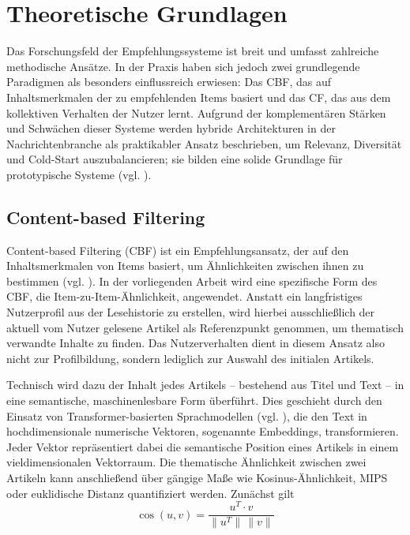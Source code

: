 

\section{Theoretische Grundlagen}
Das Forschungsfeld der Empfehlungssysteme ist breit und umfasst zahlreiche methodische
Ansätze. In der Praxis haben sich jedoch zwei grundlegende Paradigmen als besonders einflussreich erwiesen:
Das \ac{CBF}, das auf Inhaltsmerkmalen der zu empfehlenden Items basiert und das \ac{CF}, das aus dem kollektiven
Verhalten der Nutzer lernt. Aufgrund der komplementären Stärken und Schwächen dieser Systeme
werden hybride Architekturen in der Nachrichtenbranche als praktikabler Ansatz beschrieben, 
um Relevanz, Diversität und Cold-Start auszubalancieren; 
sie bilden eine solide Grundlage für prototypische Systeme 
(vgl. \cite{wu_personalized_2022,raza_news_2020}).

\subsection{Content-based Filtering}
\label{sec:cbf}
Content-based Filtering (CBF) ist ein Empfehlungsansatz, der auf den Inhaltsmerkmalen von Items basiert, 
um Ähnlichkeiten zwischen ihnen zu bestimmen (vgl. \cite{Lops_CBRS_SOTA_2011}). In der vorliegenden Arbeit 
wird eine spezifische Form des CBF, die Item-zu-Item-Ähnlichkeit, angewendet. Anstatt ein langfristiges Nutzerprofil 
aus der Lesehistorie zu erstellen, wird hierbei ausschließlich der aktuell 
vom Nutzer gelesene Artikel als Referenzpunkt genommen, um thematisch verwandte Inhalte zu finden. Das Nutzerverhalten 
dient in diesem Ansatz also nicht zur Profilbildung, sondern lediglich zur Auswahl des initialen Artikels.

Technisch wird dazu der Inhalt jedes Artikels – bestehend aus Titel und Text – in eine semantische, 
maschinenlesbare Form überführt. Dies geschieht durch den Einsatz von Transformer-basierten Sprachmodellen 
(vgl. \cite{Vaswani_transformer_2017}), die den Text in hochdimensionale numerische Vektoren, sogenannte Embeddings,
transformieren. Jeder Vektor repräsentiert dabei die semantische Position eines Artikels in einem vieldimensionalen Vektorraum. 
Die thematische Ähnlichkeit zwischen zwei Artikeln kann anschließend über gängige Maße wie Kosinus-Ähnlichkeit, 
\ac{MIPS} oder euklidische Distanz quantifiziert werden. Zunächst gilt
\begin{equation}
\label{eq:cosine_similarity}
\cos(u,v) = \frac{u^{T} \cdot v}{\lVert u^{T} \rVert \,\lVert v \rVert}
\end{equation}

